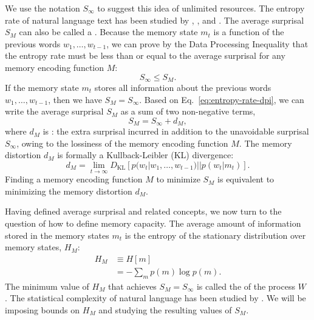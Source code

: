  We use the notation $S_\infty$ to suggest this idea of unlimited resources.
 The entropy rate of natural language text has been studied by \citet{shannon1951entropy}, \citet{takahira}, and \citet{bentz}. 
 The average surprisal $S_M$ can also be called a .  Because the memory state $m_t$ is a function of the previous words $w_1, \dots, w_{t-1}$, we can prove by the Data Processing Inequality \citep[][pp. 34--35]{cover2006elements} that the entropy rate must be less than or equal to the average surprisal for any memory encoding function $M$:
\begin{equation}
    \label{eq:entropy-rate-dpi}
    S_\infty \le S_M.
\end{equation}
If the memory state $m_t$ stores all information about the previous words $w_1, \dots, w_{t-1}$, then we have $S_M = S_\infty$.
Based on Eq.~\ref{eq:entropy-rate-dpi}, we can write the average surprisal $S_M$ as a sum of two non-negative terms,
\begin{equation}
    S_M = S_\infty + d_M,
\end{equation}
where $d_M$ is : the extra surprisal incurred in addition to the unavoidable surprisal $S_\infty$, owing to the lossiness of the memory encoding function $M$. 
The memory distortion $d_M$ is formally a Kullback-Leibler (KL) divergence:
\begin{equation}
    \label{eq:memory-distortion}
    d_M = \lim_{t \rightarrow \infty} D_{\text{KL}} [ p(w_t | w_1, \dots, w_{t-1}) || p(w_t | m_t)].
\end{equation}
Finding a memory encoding function $M$ to minimize $S_M$ is equivalent to minimizing the memory distortion $d_M$.

Having defined average surprisal and related concepts, we now turn to the question of how to define memory capacity. The average amount of information stored in the memory states $m_t$ is the entropy of the stationary distribution over memory states, $H_M$:
\begin{align}
    \label{eq:memory-entropy}
    H_M &\equiv H[m] \\
    &= - \sum_m p(m) \log p(m).
\end{align}
The minimum value of $H_M$ that achieves $S_M = S_\infty$ is called the  of the process $W$ \citep{shalizi2001computational}. The statistical complexity of natural language has been studied by \citet{hahn2019neural}. We will be imposing bounds on $H_M$ and studying the resulting values of $S_M$. 

